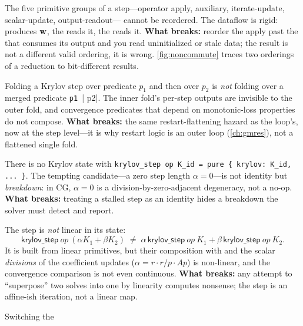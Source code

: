 \begin{description}[style=nextline, leftmargin=0pt, font=\normalfont\itshape]
  \item[The primitive sequence does not commute.] The five primitive groups of a
  step---operator apply, auxiliary, iterate-update, scalar-update, output-readout---
  cannot be reordered. The dataflow is rigid:  produces $\mathbf{w}$, the
   reads it, the  reads it. \textbf{What breaks:} reorder the
  apply past the  that consumes its output and you read uninitialized or
  stale data; the result is not a different valid ordering, it is wrong.
  \cref{fig:noncommute} traces two orderings of a reduction to bit-different results.
  \item[No fold-merge / associativity.] Folding a Krylov step over predicate $p_1$
  and then over $p_2$ is \emph{not} folding over a merged predicate
  \lstinline[style=l4style]|p1 || p2|. The inner fold's per-step outputs are invisible
  to the outer fold, and convergence predicates that depend on monotonic-loss
  properties do not compose. \textbf{What breaks:} the same restart-flattening hazard
  as the loop's, now at the step level---it is why restart logic is an outer loop
  (\cref{ch:gmres}), not a flattened single fold.
  \item[No identity element.] There is no Krylov state  with
  \lstinline[style=l4style]|krylov_step op K_id = pure { krylov: K_id, ... }|. The
  tempting candidate---a zero step length $\alpha = 0$---is not identity but
  \emph{breakdown}: in CG, $\alpha = 0$ is a division-by-zero-adjacent degeneracy, not
  a no-op. \textbf{What breaks:} treating a stalled step as an identity hides a
  breakdown the solver must detect and report.
  \item[No linearity in any argument.] The step is \emph{not} linear in its state:
  \[
    \textsf{krylov\_step}\ op\ (\alpha K_1 + \beta K_2)
      \;\neq\; \alpha\,\textsf{krylov\_step}\ op\ K_1
             + \beta\,\textsf{krylov\_step}\ op\ K_2.
  \]
  It is built from linear primitives, but their composition with  and the
  scalar \emph{divisions} of the coefficient updates ($\alpha = r\!\cdot\! r / p\!\cdot\! Ap$)
  is non-linear, and the convergence comparison is not even continuous.
  \textbf{What breaks:} any attempt to ``superpose'' two solves into one by linearity
  computes nonsense; the step is an affine-ish iteration, not a linear map.
  \item[Bit-non-determinism across orthogonalization variants.] Switching the

\end{description}
